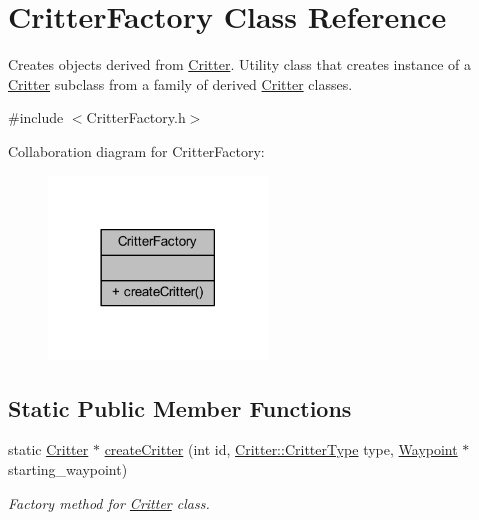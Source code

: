\hypertarget{class_critter_factory}{\section{Critter\+Factory Class Reference}
\label{class_critter_factory}
}


Creates objects derived from \hyperlink{class_critter}{Critter}. Utility class that creates instance of a \hyperlink{class_critter}{Critter} subclass from a family of derived \hyperlink{class_critter}{Critter} classes.  




{\ttfamily \#include $<$Critter\+Factory.\+h$>$}



Collaboration diagram for Critter\+Factory\+:
\nopagebreak
\begin{figure}[H]
\begin{center}
\leavevmode
\includegraphics[width=165pt]{class_critter_factory__coll__graph}
\end{center}
\end{figure}
\subsection*{Static Public Member Functions}
\begin{DoxyCompactItemize}
\item 
static \hyperlink{class_critter}{Critter} $\ast$ \hyperlink{class_critter_factory_a3195f421d348fe4ee5c7e49e605745c1}{create\+Critter} (int id, \hyperlink{class_critter_acda8a5c3234b66101e0546d75d6f90f1}{Critter\+::\+Critter\+Type} type, \hyperlink{class_waypoint}{Waypoint} $\ast$starting\+\_\+waypoint)
\begin{DoxyCompactList}\small\item\em Factory method for \hyperlink{class_critter}{Critter} class. \end{DoxyCompactList}\end{DoxyCompactItemize}


